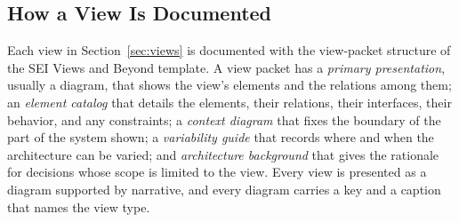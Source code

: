 \subsection{How a View Is Documented}
\label{sec:how-view-documented}

Each view in Section~\ref{sec:views} is documented with the view-packet structure of
the SEI Views and Beyond template. A view packet has a \emph{primary presentation},
usually a diagram, that shows the view's elements and the relations among them; an
\emph{element catalog} that details the elements, their relations, their interfaces,
their behavior, and any constraints; a \emph{context diagram} that fixes the boundary
of the part of the system shown; a \emph{variability guide} that records where and
when the architecture can be varied; and \emph{architecture background} that gives
the rationale for decisions whose scope is limited to the view. Every view is
presented as a diagram supported by narrative, and every diagram carries a key and a
caption that names the view type.
